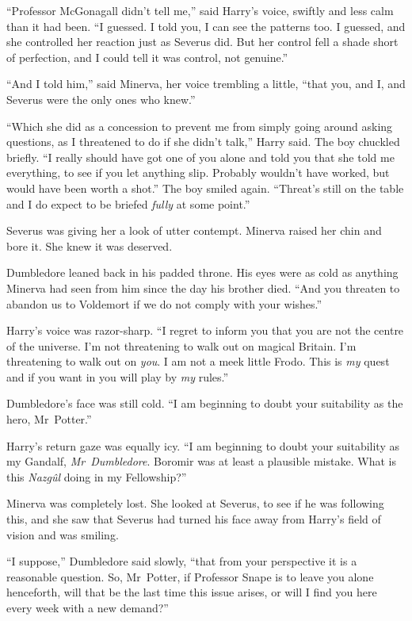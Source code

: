 “Professor McGonagall didn’t tell me,” said Harry’s voice, swiftly and less calm than it had been. “I guessed. I told you, I can see the patterns too. I guessed, and she controlled her reaction just as Severus did. But her control fell a shade short of perfection, and I could tell it was control, not genuine.”

“And I told him,” said Minerva, her voice trembling a little, “that you, and I, and Severus were the only ones who knew.”

“Which she did as a concession to prevent me from simply going around asking questions, as I threatened to do if she didn’t talk,” Harry said. The boy chuckled briefly. “I really should have got one of you alone and told you that she told me everything, to see if you let anything slip. Probably wouldn’t have worked, but would have been worth a shot.” The boy smiled again. “Threat’s still on the table and I do expect to be briefed \emph{fully} at some point.”

Severus was giving her a look of utter contempt. Minerva raised her chin and bore it. She knew it was deserved.

Dumbledore leaned back in his padded throne. His eyes were as cold as anything Minerva had seen from him since the day his brother died. “And you threaten to abandon us to Voldemort if we do not comply with your wishes.”

Harry’s voice was razor-sharp. “I regret to inform you that you are not the centre of the universe. I’m not threatening to walk out on magical Britain. I’m threatening to walk out on \emph{you}. I am not a meek little Frodo. This is \emph{my} quest and if you want in you will play by \emph{my} rules.”

Dumbledore’s face was still cold. “I am beginning to doubt your suitability as the hero, Mr~Potter.”

Harry’s return gaze was equally icy. “I am beginning to doubt your suitability as my Gandalf, \emph{Mr~Dumbledore}. Boromir was at least a plausible mistake. What is this \emph{Nazgûl} doing in my Fellowship?”

Minerva was completely lost. She looked at Severus, to see if he was following this, and she saw that Severus had turned his face away from Harry’s field of vision and was smiling.

“I suppose,” Dumbledore said slowly, “that from your perspective it is a reasonable question. So, Mr~Potter, if Professor Snape is to leave you alone henceforth, will that be the last time this issue arises, or will I find you here every week with a new demand?”


